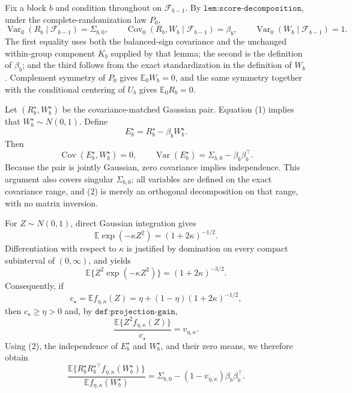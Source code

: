 Fix a block \(b\) and condition throughout on \(\mathcal F_{b-1}\).  By \(\texttt{lem:score-decomposition}\), under the complete-randomization law \(P_0\),
\[
 \operatorname{Var}_0(R_b\mid\mathcal F_{b-1})=\Sigma_{b,0},
 \qquad
 \operatorname{Cov}_0(R_b,W_b\mid\mathcal F_{b-1})=\beta_b,
 \qquad
 \operatorname{Var}_0(W_b\mid\mathcal F_{b-1})=1.                 \tag{1}
\]
The first equality uses both the balanced-sign covariance and the unchanged within-group component \(K_b\) supplied by that lemma; the second is the definition of \(\beta_b\); and the third follows from the exact standardization in the definition of \(W_b\).  Complement symmetry of \(P_0\) gives \(\mathbb E_0W_b=0\), and the same symmetry together with the conditional centering of \(U_b\) gives \(\mathbb E_0R_b=0\).

Let \((R_b^\star,W_b^\star)\) be the covariance-matched Gaussian pair.  Equation (1) implies that \(W_b^\star\sim N(0,1)\).  Define
\[
 E_b^\star=R_b^\star-\beta_bW_b^\star.
\]
Then
\[
 \operatorname{Cov}(E_b^\star,W_b^\star)=0,
 \qquad
 \operatorname{Var}(E_b^\star)=\Sigma_{b,0}-\beta_b\beta_b^\top. \tag{2}
\]
Because the pair is jointly Gaussian, zero covariance implies independence.  This argument also covers singular \(\Sigma_{b,0}\): all variables are defined on the exact covariance range, and (2) is merely an orthogonal decomposition on that range, with no matrix inversion.

For \(Z\sim N(0,1)\), direct Gaussian integration gives
\[
 \mathbb E\exp(-\kappa Z^2)=(1+2\kappa)^{-1/2}.
\]
Differentiation with respect to \(\kappa\) is justified by domination on every compact subinterval of \((0,\infty)\), and yields
\[
 \mathbb E\{Z^2\exp(-\kappa Z^2)\}=(1+2\kappa)^{-3/2}.
\]
Consequently, if
\[
 c_\star=\mathbb Ef_{\eta,\kappa}(Z)
 =\eta+(1-\eta)(1+2\kappa)^{-1/2},
\]
then \(c_\star\geq\eta>0\) and, by \(\texttt{def:projection-gain}\),
\[
 \frac{\mathbb E\{Z^2f_{\eta,\kappa}(Z)\}}{c_\star}
 =v_{\eta,\kappa}.                                             \tag{3}
\]
Using (2), the independence of \(E_b^\star\) and \(W_b^\star\), and their zero means, we therefore obtain
\[
 \frac{\mathbb E\{R_b^\star R_b^{\star\top}
 f_{\eta,\kappa}(W_b^\star)\}}
      {\mathbb Ef_{\eta,\kappa}(W_b^\star)}
 =\Sigma_{b,0}-(1-v_{\eta,\kappa})\beta_b\beta_b^\top.       \tag{4}
\]

